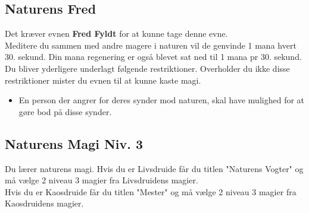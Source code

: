 \subsection{Naturens Fred}
Det kræver evnen \textbf{Fred Fyldt} for at kunne tage denne evne.\\
Meditere du sammen med andre magere i naturen vil de genvinde 1 mana hvert 30. sekund. Din mana regenering er også blevet sat ned til 1 mana pr 30. sekund.\\
Du bliver yderligere underlagt følgende restriktioner. Overholder du ikke disse restriktioner mister du evnen til at kunne kaste magi.
\begin{itemize}
    \item En person der angrer for deres synder mod naturen, skal have mulighed for at gøre bod på disse synder.
\end{itemize}

\subsection{Naturens Magi Niv. 3}
Du lærer naturens magi. Hvis du er Livsdruide får du titlen "Naturens Vogter" og må vælge 2 niveau 3 magier fra Livsdruidens magier.\\ Hvis du er Kaosdruide får du titlen "Mester" og må vælge 2 niveau 3 magier fra Kaosdruidens magier.\\
